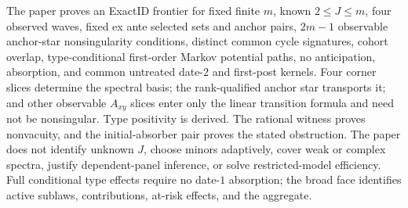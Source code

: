 \documentclass{article}
\begin{document}
The paper proves an ExactID frontier for fixed finite \(m\), known \(2\leq J\leq m\), four observed waves, fixed ex ante selected sets and anchor pairs, \(2m-1\) observable anchor-star nonsingularity conditions, distinct common cycle signatures, cohort overlap, type-conditional first-order Markov potential paths, no anticipation, absorption, and common untreated date-\(2\) and first-post kernels.  Four corner slices determine the spectral basis; the rank-qualified anchor star transports it; and other observable \(A_{xy}\) slices enter only the linear transition formula and need not be nonsingular.  Type positivity is derived.  The rational witness proves nonvacuity, and the initial-absorber pair proves the stated obstruction.  The paper does not identify unknown \(J\), choose minors adaptively, cover weak or complex spectra, justify dependent-panel inference, or solve restricted-model efficiency.  Full conditional type effects require no date-\(1\) absorption; the broad face identifies active sublaws, contributions, at-risk effects, and the aggregate.
\end{document}
